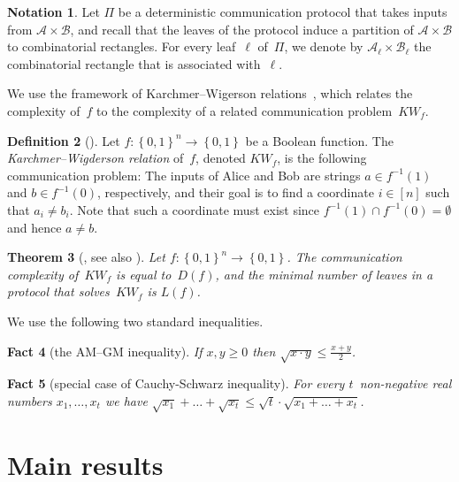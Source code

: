 \documentclass[11pt]{article}
\numberwithin{equation}{section}
\newtheorem{theorem}{Theorem}[section]
\newtheorem{fact}[theorem]{Fact}
\theoremstyle{definition}
\newtheorem{definition}[theorem]{Definition}
\theoremstyle{plain}
\theoremstyle{definition}\newtheorem{notation}[theorem]{Notation}\theoremstyle{plain}
\newcommand{\B}{\left\{ 0,1 \right \}}
\newcommand{\cA}{\mathcal{A}}
\newcommand{\cB}{\mathcal{B}}
\newcommand{\KW}{\mathit{KW}}
\theoremstyle{definition}
\theoremstyle{plain}
\begin{document}
\begin{notation}
\label{notation:partition-to-rectangles}Let $\Pi$ be a deterministic communication
protocol that takes inputs from $\cA\times\cB$, and recall that the
leaves of the protocol induce a partition of $\cA\times\cB$ to combinatorial
rectangles. For every leaf~$\ell$ of~$\Pi$, we denote by $\cA_{\ell}\times\cB_{\ell}$
the combinatorial rectangle that is associated with~$\ell$. 
\end{notation}

We use the framework of Karchmer--Wigerson relations~\cite{KW90},
which relates the complexity of~$f$ to the complexity of a related
communication problem~$\KW_{f}$. 
\begin{definition}[\cite{KW90}]
Let $f\colon\B^{n}\to\B$ be a Boolean function. The \emph{Karchmer--Wigderson
relation} of~$f$, denoted $\KW_{f}$, is the following communication
problem: The inputs of Alice and Bob are strings $a\in f^{-1}(1)$
and $b\in f^{-1}(0)$, respectively, and their goal is to find a coordinate
$i\in\left[n\right]$ such that $a_{i}\ne b_{i}$. Note that such
a coordinate must exist since $f^{-1}(1)\cap f^{-1}(0)=\emptyset$
and hence $a\ne b$. 
\end{definition}

\begin{theorem}[\cite{KW90}, see also \cite{R90}]
\label{thm:KW-connection}Let $f\colon\B^{n}\to\B$. The communication
complexity of~$\KW_{f}$ is equal to~$D(f)$, and the minimal number
of leaves in a protocol that solves~$\KW_{f}$ is $L(f)$. 
\end{theorem}

%
We use the following two standard inequalities.
\begin{fact}[the AM--GM inequality]
%
%
%
%
%
If $x,y\ge 0$ then $\sqrt{x\cdot y}\le\frac{x+y}{2}$.
\end{fact}

\begin{fact}[special case of Cauchy-Schwarz inequality]
\label{fact:special-cauchy-schwarz} For every $t$~non-negative real
numbers $x_{1},\ldots,x_{t}$ we have $\sqrt{x_{1}}+\ldots+\sqrt{x_{t}}\le\sqrt{t}\cdot\sqrt{x_{1}+\ldots+x_{t}}$.   \qedhere
\end{fact}

%
%
%
%
%

\section{\label{sec:Main-results}Main results}
\end{document}
